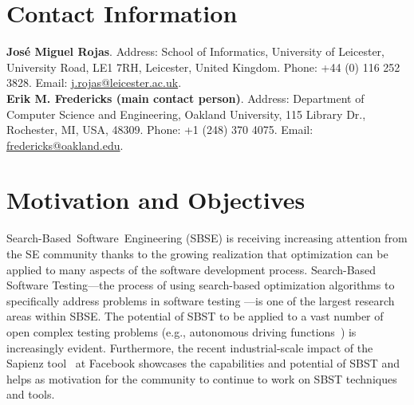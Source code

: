 \documentclass[sigconf,review]{acmart}
\begin{document}
\maketitle



\section{Contact Information}

\noindent \textbf{Jos\'e Miguel Rojas}. Address:
School of Informatics, University of Leicester, University Road,
LE1 7RH, Leicester, United Kingdom. Phone: +44 (0) 116 252
3828. Email: \url{j.rojas@leicester.ac.uk}.\\
\textbf{Erik M. Fredericks (main contact person)}. Address:
Department of Computer Science and Engineering, Oakland University, 115 Library Dr.,
Rochester, MI, USA, 48309. Phone: +1 (248) 370 4075. Email: \url{fredericks@oakland.edu}.

\section{Motivation and Objectives}
\label{sec:themes}
  
Search-Based~Software~Engineering (SBSE) \cite{mhbj:manifesto} is
receiving increasing attention from the SE community thanks to the
growing realization that optimization can be applied to many aspects
of the software development process.  Search-Based Software
Testing---the process of using search-based optimization algorithms to
specifically address problems in software testing
\cite{mcminn:survey}---is one of the largest research areas within
SBSE. The potential of SBST to be applied to a vast number of open
complex testing problems (e.g., autonomous driving
functions~\cite{Abdessalem2018}) is increasingly evident. Furthermore,
the recent industrial-scale impact of the Sapienz tool~\cite{Sapienz}
at Facebook showcases the capabilities and potential
of SBST and helps as motivation for the community to continue to work
on SBST techniques and tools.
\end{document}

